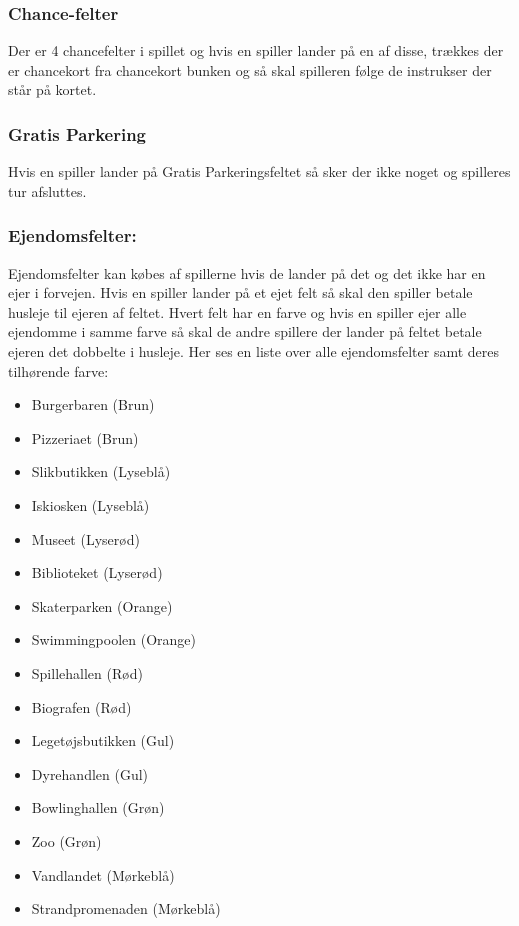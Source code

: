 \documentclass[../main.tex]{subfiles}
\begin{document}
\begin{flushleft}
\subsubsection*{Chance-felter}
Der er 4 chancefelter i spillet og hvis en spiller lander på en af disse, trækkes der er chancekort fra chancekort bunken og så skal spilleren følge de instrukser der står på kortet.

\subsubsection*{Gratis Parkering}
Hvis en spiller lander på Gratis Parkeringsfeltet så sker der ikke noget og spilleres tur afsluttes.

\subsubsection*{Ejendomsfelter:}
Ejendomsfelter kan købes af spillerne hvis de lander på det og det ikke har en ejer i forvejen. Hvis en spiller lander på et ejet felt så skal den spiller betale husleje til ejeren af feltet. Hvert felt har en farve og hvis en spiller ejer alle ejendomme i samme farve så skal de andre spillere der lander på feltet betale ejeren det dobbelte i husleje. Her ses en liste over alle ejendomsfelter samt deres tilhørende farve:
\begin{itemize}
    \item Burgerbaren (Brun)
    \item Pizzeriaet (Brun)
    \item Slikbutikken (Lyseblå)
    \item Iskiosken (Lyseblå)
    \item Museet (Lyserød)
    \item Biblioteket (Lyserød)
    \item Skaterparken (Orange)
    \item Swimmingpoolen (Orange)
    \item Spillehallen (Rød)
    \item Biografen (Rød)
    \item Legetøjsbutikken (Gul)
    \item Dyrehandlen  (Gul)
    \item Bowlinghallen (Grøn)
    \item Zoo (Grøn)
    \item Vandlandet (Mørkeblå)
    \item Strandpromenaden (Mørkeblå)
\end{itemize}


\end{flushleft}
\end{document}

